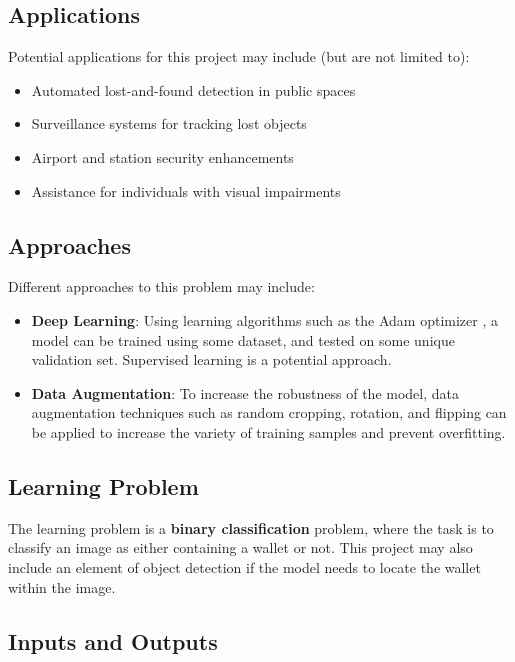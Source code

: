 \documentclass{report}
\begin{document}
\subsection{Applications}
Potential applications for this project may include (but are not limited to):
\begin{itemize}
    \item Automated lost-and-found detection in public spaces
    \item Surveillance systems for tracking lost objects
    \item Airport and station security enhancements
    \item Assistance for individuals with visual impairments
\end{itemize}

\subsection{Approaches}
Different approaches to this problem may include:

\begin{itemize}
    
    \item \textbf{Deep Learning}: Using learning algorithms such as the Adam optimizer \cite{adamOptimizerGFG}, a model can be trained using some dataset, and tested on some unique validation set. Supervised learning is a potential approach. 

    \item \textbf{Data Augmentation}: To increase the robustness of the model, data augmentation techniques such as random cropping, rotation, and flipping can be applied to increase the variety of training samples and prevent overfitting.
\end{itemize}

\subsection{Learning Problem}

The learning problem is a \textbf{binary classification} problem, where the task is to classify an image as either containing a wallet or not. This project may also include an element of object detection if the model needs to locate the wallet within the image.

\subsection{Inputs and Outputs}
\end{document}
